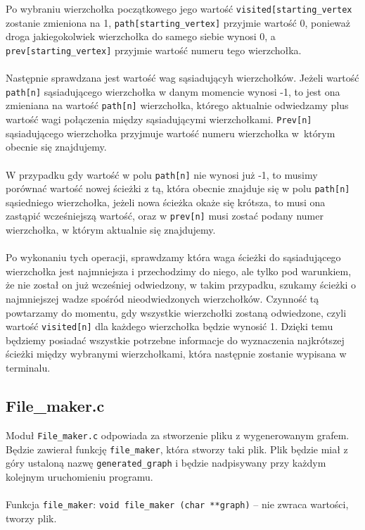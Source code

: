 \documentclass[12pt, a4paper]{article}
\begin{document}
Po wybraniu wierzchołka początkowego jego wartość \texttt{visited[starting\_vertex} zostanie zmieniona na 1, \texttt{path[starting\_vertex]} przyjmie wartość 0, ponieważ droga jakiegokolwiek wierzchołka do samego siebie wynosi 0, a \texttt{prev[starting\_vertex]} przyjmie wartość numeru tego wierzchołka.\\\\ Następnie sprawdzana jest wartość wag sąsiadującyh wierzchołków. Jeżeli wartość \texttt{path[n]} sąsiadującego wierzchołka w danym momencie wynosi -1, to jest ona zmieniana na wartość \texttt{path[n]} wierzchołka, którego aktualnie odwiedzamy plus wartość wagi połączenia między sąsiadującymi wierzchołkami. \texttt{Prev[n]} sąsiadującego wierzchołka przyjmuje wartość numeru wierzchołka w~którym obecnie się znajdujemy. \\\\W przypadku gdy wartość w polu \texttt{path[n]} nie wynosi już -1, to musimy porównać wartość nowej ścieżki z tą, która obecnie znajduje się w polu \texttt{path[n]} sąsiedniego wierzchołka, jeżeli nowa ścieżka okaże się krótsza, to musi ona zastąpić wcześniejszą wartość, oraz w \texttt{prev[n]} musi zostać podany numer wierzchołka, w którym aktualnie się znajdujemy.\\\\ Po wykonaniu tych operacji, sprawdzamy która waga ścieżki do sąsiadującego wierzchołka jest najmniejsza i przechodzimy do niego, ale tylko pod warunkiem, że nie został on już wcześniej odwiedzony, w takim przypadku, szukamy ścieżki o najmniejszej wadze spośród nieodwiedzonych wierzchołków. Czynność tą powtarzamy do momentu, gdy wszystkie wierzchołki zostaną odwiedzone, czyli wartość \texttt{visited[n]} dla każdego wierzchołka będzie wynosić 1. Dzięki temu będziemy posiadać wszystkie potrzebne informacje do wyznaczenia najkrótszej ścieżki między wybranymi wierzchołkami, która następnie zostanie wypisana w terminalu.


\subsection{File\_maker.c}
Moduł \texttt{File\_maker.c} odpowiada za stworzenie pliku z wygenerowanym grafem. Będzie zawierał funkcję \texttt{file\_maker}, która stworzy taki plik. Plik będzie miał z góry ustaloną nazwę \texttt{generated\_graph} i będzie nadpisywany przy każdym kolejnym uruchomieniu programu.
\\\\
Funkcja \texttt{file\_maker}: \texttt{void file\_maker (char **graph)} -- nie zwraca wartości, tworzy plik.
\end{document}
